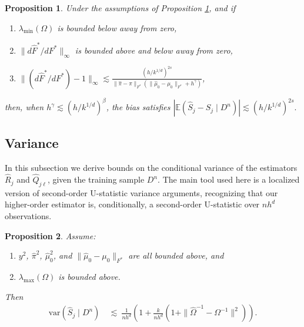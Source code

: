 \documentclass[11pt,twoside]{article}
\newcommand{\var}{\text{var}}
\newcommand{\E}{\mathbb{E}}
\newtheorem{proposition}{Proposition}
\theoremstyle{definition}
\theoremstyle{remark}
\begin{document}
\begin{proposition} \label{prop:bias2}
Under the assumptions of Proposition \ref{prop:bias2}, and if
\begin{enumerate}
\item $\lambda_{\min}(\Omega)$ is bounded below away from zero, 
\item $\| d\widehat{F}^*/dF^*\|_\infty$ is bounded above and below away from zero, 
\item $\| (d\widehat{F}^*/dF^*)-1 \|_\infty \lesssim \frac{ (h/k^{1/d})^{2s} }{ \| \widehat\pi-\pi \|_{F^*} (\| \widehat\mu_0-\mu_0 \|_{F^*} + h^\gamma) }$,
\end{enumerate}
then, when $h^\gamma \lesssim (h/k^{1/d})^\beta$, the bias satisfies $| \E(\widehat{S}_j - S_j \mid D^n) | \lesssim 
 \left( h/k^{1/d} \right)^{2s}.$
\end{proposition}

\bigskip

\subsection{Variance}
\label{sec:variance}

In this subsection we derive bounds on  the conditional variance of the estimators $\widehat{R}_j$ and $\widehat{Q}_{j\ell}$, given the training sample $D^n$. The main tool used here is a  localized version of second-order U-statistic variance arguments, recognizing that our higher-order estimator is, conditionally, a second-order U-statistic over $nh^d$ observations. \\

\begin{proposition} \label{prop:variance}
Assume:
\begin{enumerate}
\item $y^2$, $\widehat\pi^2$, $\widehat\mu_0^2$, and $\| \widehat\mu_0 - \mu_0 \|_{F^*}$ are all bounded above, and
\item $\lambda_{\max}(\Omega)$ is bounded above. 
\end{enumerate}
Then
\begin{align*}
\var(\widehat{S}_j   \mid D^n)  & \ \lesssim \ \frac{1}{nh^d} \left( 1 + \frac{k  }{n  h^{d}} \left( 1 + \| \widehat\Omega^{-1}-\Omega^{-1} \|^2 \right) \right) .
\end{align*}
\end{proposition}

\bigskip
\end{document}
